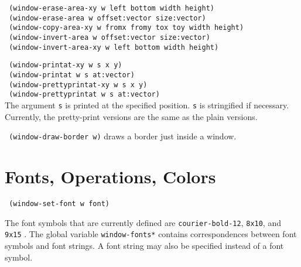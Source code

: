 \vspace{0.1in}
{\tt \hspace*{0.5in} (window-erase-area-xy w left bottom width height)} \\
{\tt \hspace*{0.5in} (window-erase-area w offset:vector size:vector)} \\
{\tt \hspace*{0.5in} (window-copy-area-xy w fromx fromy	tox toy width height)} \\
{\tt \hspace*{0.5in} (window-invert-area w offset:vector size:vector)} \\
{\tt \hspace*{0.5in} (window-invert-area-xy w left bottom width height)}

\vspace{0.1in}
{\tt \hspace*{0.5in} (window-printat-xy w s x y)} \\
{\tt \hspace*{0.5in} (window-printat w s at:vector)} \\
{\tt \hspace*{0.5in} (window-prettyprintat-xy w s x y)} \\
{\tt \hspace*{0.5in} (window-prettyprintat w s at:vector)} \\

\vspace{-0.1in}
The argument {\tt s} is printed at the specified position.
{\tt s} is stringified if necessary.
Currently, the pretty-print versions are the same as the plain versions.

\vspace{0.1in}
{\tt \hspace*{0.5in} (window-draw-border w)} draws a border just
inside a window.

\section{Fonts, Operations, Colors}

{\tt \hspace*{0.5in} (window-set-font w font)}

\vspace{-0.1in}
The font symbols that are currently defined are {\tt courier-bold-12},
{\tt 8x10}, and {\tt 9x15} .  The global variable {\tt *window-fonts*}
contains correspondences between font symbols and font strings.
A font string may also be specified instead of a font symbol.


